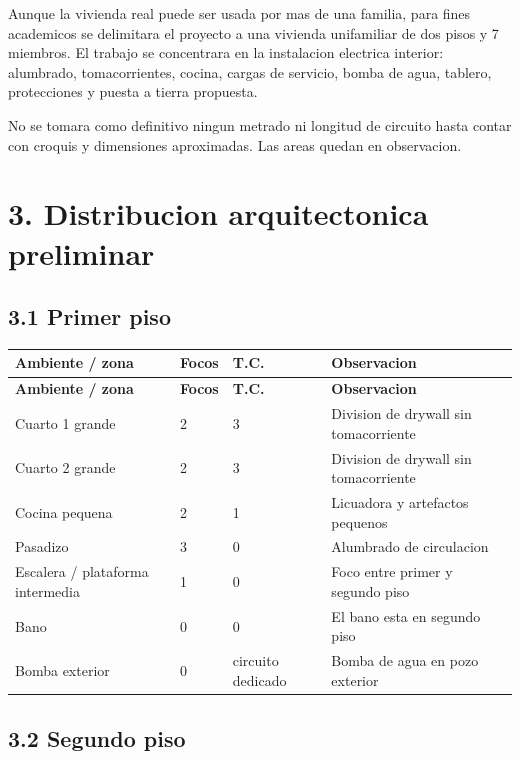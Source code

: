 \documentclass[12pt,a4paper]{article}
\begin{document}
Aunque la vivienda real puede ser usada por mas de una familia, para fines academicos se delimitara el proyecto a una vivienda unifamiliar de dos pisos y 7 miembros. El trabajo se concentrara en la instalacion electrica interior: alumbrado, tomacorrientes, cocina, cargas de servicio, bomba de agua, tablero, protecciones y puesta a tierra propuesta.

No se tomara como definitivo ningun metrado ni longitud de circuito hasta contar con croquis y dimensiones aproximadas. Las areas quedan en observacion.

\section*{3. Distribucion arquitectonica preliminar}

\subsection*{3.1 Primer piso}

\begin{longtable}{L{4cm}R{2cm}R{3cm}L{5.2cm}}
\toprule
\textbf{Ambiente / zona} & \textbf{Focos} & \textbf{T.C.} & \textbf{Observacion} \\
\midrule
\endfirsthead
\toprule
\textbf{Ambiente / zona} & \textbf{Focos} & \textbf{T.C.} & \textbf{Observacion} \\
\midrule
\endhead
Cuarto 1 grande & 2 & 3 & Division de drywall sin tomacorriente \\
Cuarto 2 grande & 2 & 3 & Division de drywall sin tomacorriente \\
Cocina pequena & 2 & 1 & Licuadora y artefactos pequenos \\
Pasadizo & 3 & 0 & Alumbrado de circulacion \\
Escalera / plataforma intermedia & 1 & 0 & Foco entre primer y segundo piso \\
Bano & 0 & 0 & El bano esta en segundo piso \\
Bomba exterior & 0 & circuito dedicado & Bomba de agua en pozo exterior \\
\bottomrule
\end{longtable}

\subsection*{3.2 Segundo piso}
\end{document}
